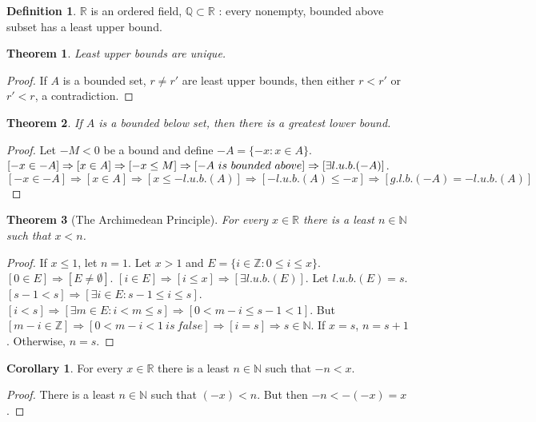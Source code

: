 \documentclass[oneside]{book}
\newtheorem{theorem}{Theorem}[section]
\theoremstyle{definition}
\newtheorem{definition}{Definition}[section]
\newtheorem{corollary}{Corollary}[section]
\begin{document}
\begin{definition}
$\mathbb{R}$ is an ordered field, $\mathbb{Q}\subset \mathbb{R}$ : every nonempty, bounded above subset has a least upper bound.
\end{definition}

\begin{theorem}
Least upper bounds are unique.
\end{theorem}
\begin{proof}
If $A$ is a bounded set, $r\ne r'$ are least upper bounds, then either $r<r'$ or $r'<r$, a contradiction.
\end{proof}

\begin{theorem}
If $A$ is a bounded below set, then there is a greatest lower bound.
\end{theorem}
\begin{proof}
Let $-M<0$ be a bound and define $-A = \{-x: x\in A\}$. $[-x\in -A]\Rightarrow [x\in A]\Rightarrow [-x\leq M]\Rightarrow [-A\ is\ bounded\ above]\\ \Rightarrow [\exists l.u.b.(-A)]$. $[-x\in -A]\Rightarrow [x\in A]\Rightarrow [x\leq -l.u.b.(A)]\Rightarrow [-l.u.b.(A)\leq -x]\Rightarrow [g.l.b.(-A)=-l.u.b.(A)]$
\end{proof}

\begin{theorem}[The Archimedean Principle]
For every $x\in \mathbb{R}$ there is a least $n\in \mathbb{N}$ such that $x<n$. 
\end{theorem}
\begin{proof}
If $x\leq1$, let $n=1$. Let $x>1$ and $E=\{i \in \mathbb{Z}: 0 \leq i \leq x\}$. $[0\in E]\Rightarrow [E\ne \emptyset]$. $[i\in E]\Rightarrow [i\leq x]\Rightarrow [\exists l.u.b.(E)]$. Let $l.u.b.(E)=s$. $[s-1<s]\Rightarrow [\exists i \in E:s-1 \leq i \leq s]$. $[i< s]\Rightarrow[\exists m\in E: i < m \leq s]\Rightarrow [0 < m-i \leq s-1 < 1]$. But $[m-i \in \mathbb{Z}]\Rightarrow [0<m-i<1\ is\ false]\Rightarrow [i = s]\Rightarrow s\in \mathbb{N}$. If $x=s$, $n = s+1$. Otherwise, $n=s$.
\end{proof}

\begin{corollary}
For every $x\in \mathbb{R}$ there is a least $n\in \mathbb{N}$ such that $-n<x$.
\end{corollary}
\begin{proof}
There is a least $n\in \mathbb{N}$ such that $(-x)<n$. But then $-n <-(-x) = x$. 
\end{proof}
\end{document}
